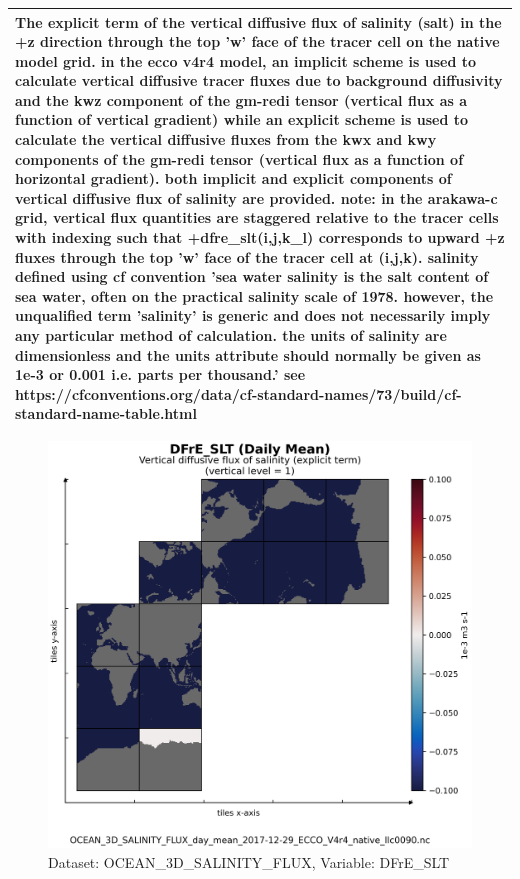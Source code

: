 \begin{longtable}{|m{}|m{}|m{}|m{}|}
\multicolumn{4}{|p{1\textwidth}|}{\footnotesize{{The explicit term of the vertical diffusive flux of salinity (salt) in the +z direction through the top 'w' face of the tracer cell on the native model grid. in the ecco v4r4 model, an implicit scheme is used to calculate vertical diffusive tracer fluxes due to background diffusivity and the kwz component of the gm-redi tensor (vertical flux as a function of vertical gradient) while an explicit scheme is used to calculate the vertical diffusive fluxes from the kwx and kwy components of the gm-redi tensor (vertical flux as a function of horizontal gradient). both implicit and explicit components of vertical diffusive flux of salinity are provided. note: in the arakawa-c grid, vertical flux quantities are staggered relative to the tracer cells with indexing such that +dfre\_slt(i,j,k\_l) corresponds to upward +z fluxes through the top 'w' face of the tracer cell at (i,j,k). salinity defined using cf convention 'sea water salinity is the salt content of sea water, often on the practical salinity scale of 1978. however, the unqualified term 'salinity' is generic and does not necessarily imply any particular method of calculation. the units of salinity are dimensionless and the units attribute should normally be given as 1e-3 or 0.001 i.e. parts per thousand.' see https://cfconventions.org/data/cf-standard-names/73/build/cf-standard-name-table.html}}} \\ \hline
\end{longtable}

\begin{figure}[H]
\centering
\includegraphics[scale=0.55]{../images/plots/v4r4/native_plots/Ocean_Three-Dimensional_Salinity_Fluxes/DFrE_SLT.png}
\caption{Dataset: OCEAN\_3D\_SALINITY\_FLUX, Variable: DFrE\_SLT}
\label{tab:table-OCEAN_3D_SALINITY_FLUX_DFrE_SLT-Plot}
\end{figure}
\newpage
\pagebreak
